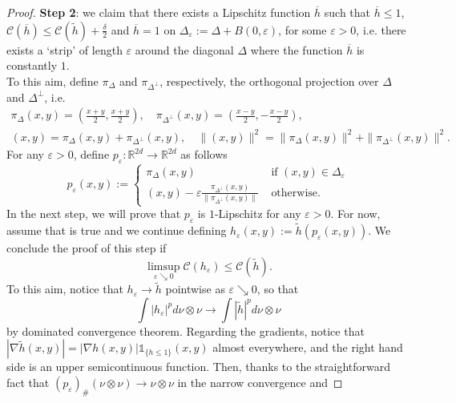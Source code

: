 \documentclass[10pt,leqno]{amsart}
\numberwithin{equation}{section}
\newcommand{\R}{\mathbb{R}}
\begin{document}
\begin{proof}
    \textbf{Step 2}: we claim that there exists a Lipschitz function $\overline{h}$ such that $\overline{h}\leq 1$, $\mathcal{C}(\overline{h})\leq \mathcal{C}(\tilde{h}) + \frac{\delta}{2}$ and $\overline{h} = 1$ on $\Delta_{\varepsilon}:= \Delta+B(0,\varepsilon)$, for some $\varepsilon>0$, i.e. there exists a `strip' of length $\varepsilon$ around the diagonal $\Delta$ where the function $\overline{h}$ is constantly $1$.
    \\
    To this aim, define $\pi_\Delta$ and $\pi_{\Delta^\perp}$, respectively, the orthogonal projection over $\Delta$ and $\Delta^\perp$, i.e. 
    \begin{align*}
        \pi_\Delta(x,y) = \left(\frac{x+y}{2}, \frac{x+y}{2}\right), \quad \pi_{\Delta^\perp}(x,y) = \left( \frac{x-y}{2}, - \frac{x-y}{2} \right), \\
        (x,y) = \pi_\Delta(x,y) + \pi_{\Delta^\perp}(x,y), \quad \|(x,y)\|^2 = \|\pi_\Delta(x,y)\|^2 + \|\pi_{\Delta^\perp}(x,y)\|^2.
    \end{align*}
    For any $\varepsilon>0$, define $p_\varepsilon:\R^{2d}\to \R^{2d}$ as follows 
    \begin{equation}
        p_\varepsilon(x,y) := \begin{cases}
            \pi_{\Delta}(x,y) \quad & \text{ if } (x,y) \in \Delta_\varepsilon
            \\
            (x,y) - \varepsilon \frac{\pi_{\Delta^\perp}(x,y)}{\|\pi_{\Delta^\perp}(x,y)\|} & \text{ otherwise}.
        \end{cases}
    \end{equation}
    In the next step, we will prove that $p_\varepsilon$ is $1$-Lipschitz for any $\varepsilon>0$. For now, assume that is true and we continue defining $h_\varepsilon(x,y) := \tilde{h}(p_\varepsilon(x,y))$. 
    We conclude the proof of this step if 
    \[\limsup_{\varepsilon\searrow 0} \mathcal{C}(h_\varepsilon)\leq \mathcal{C}(\tilde{h}).\]
    To this aim, notice that $h_\varepsilon \to \tilde{h}$ pointwise as $\varepsilon \searrow 0$, so that 
    \[\int |h_\varepsilon|^p d\nu\otimes \nu \to \int|\tilde{h}|^p d\nu\otimes \nu\]
    by dominated convergence theorem. Regarding the gradients, notice that $|\nabla \tilde{h}(x,y)|=  |\nabla h(x,y)| \mathds{1}_{\{ h\leq 1\} }(x,y)$ almost everywhere, and the right hand side is an upper semicontinuous function. Then, thanks to the straightforward fact that $(p_\varepsilon)_\#(\nu\otimes \nu) \to \nu\otimes \nu$ in the narrow convergence and 

\end{proof}
\end{document}
